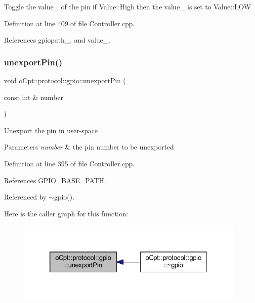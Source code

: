 Toggle the value\+\_\+ of the pin if Value\+::\+High then the value\+\_\+ is set to Value\+::\+L\+OW 

Definition at line 409 of file Controller.\+cpp.



References gpiopath\+\_\+, and value\+\_\+.

\hypertarget{classo_cpt_1_1protocol_1_1gpio_af6383ac93d965d156617147c652ae56f}{}\label{classo_cpt_1_1protocol_1_1gpio_af6383ac93d965d156617147c652ae56f} 
\subsubsection{\texorpdfstring{unexport\+Pin()}{unexportPin()}}
{\footnotesize\ttfamily void o\+Cpt\+::protocol\+::gpio\+::unexport\+Pin (\begin{DoxyParamCaption}\item[{const int \&}]{number }\end{DoxyParamCaption})\hspace{0.3cm}{\ttfamily [private]}}

Unexport the pin in user-\/space 
\begin{DoxyParams}{Parameters}
{\em number} & the pin number to be unexported \\
\hline
\end{DoxyParams}


Definition at line 395 of file Controller.\+cpp.



References G\+P\+I\+O\+\_\+\+B\+A\+S\+E\+\_\+\+P\+A\+TH.



Referenced by $\sim$gpio().

Here is the caller graph for this function\+:\nopagebreak
\begin{figure}[H]
\begin{center}
\leavevmode
\includegraphics[width=318pt]{classo_cpt_1_1protocol_1_1gpio_af6383ac93d965d156617147c652ae56f_icgraph}
\end{center}
\end{figure}
\hypertarget{classo_cpt_1_1protocol_1_1gpio_a0fd140f4fb32047ceba4a9a17891efe0}{}\label{classo_cpt_1_1protocol_1_1gpio_a0fd140f4fb32047ceba4a9a17891efe0} 
